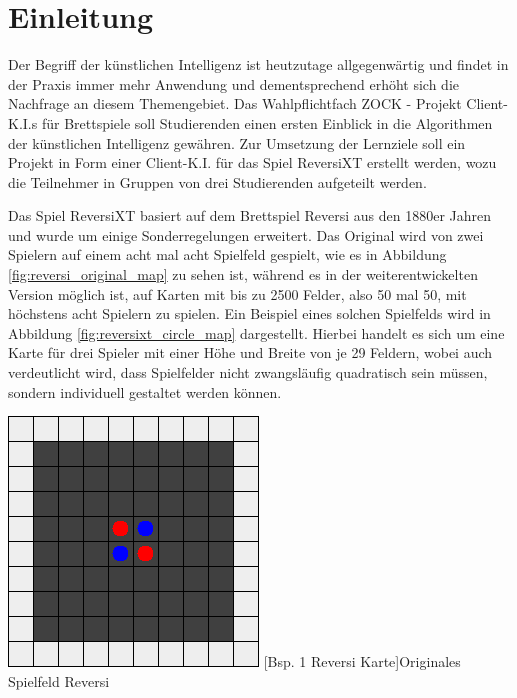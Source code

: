 \documentclass[12pt,a4paper,bibliography=totocnumbered,listof=totocnumbered]{article}
\begin{document}
\section{Einleitung} \label{kap:Einleitung}
Der Begriff der \glqq künstlichen Intelligenz\grqq{} ist heutzutage allgegenwärtig und findet in der Praxis immer mehr Anwendung und dementsprechend erhöht sich die Nachfrage an diesem Themengebiet.
Das Wahlpflichtfach \glqq ZOCK - Projekt Client-K.I.s für Brettspiele\grqq{} soll Studierenden einen ersten Einblick in die Algorithmen der künstlichen Intelligenz gewähren. Zur Umsetzung der Lernziele soll ein Projekt in Form einer Client-K.I. für das Spiel ReversiXT erstellt werden, wozu die Teilnehmer in Gruppen von drei Studierenden aufgeteilt werden. 

Das Spiel ReversiXT basiert auf dem Brettspiel Reversi aus den 1880er Jahren und wurde um einige Sonderregelungen erweitert. Das Original wird von zwei Spielern auf einem acht mal acht Spielfeld gespielt, wie es in Abbildung \ref{fig:reversi_original_map} zu sehen ist, während es in der weiterentwickelten Version möglich ist, auf Karten mit bis zu 2500 Felder, also 50 mal 50, mit höchstens acht Spielern zu spielen. Ein Beispiel eines solchen Spielfelds wird in Abbildung \ref{fig:reversixt_circle_map} dargestellt. Hierbei handelt es sich um eine Karte für drei Spieler mit einer Höhe und Breite von je 29 Feldern, wobei auch verdeutlicht wird, dass Spielfelder nicht zwangsläufig quadratisch sein müssen, sondern individuell gestaltet werden können.

\vspace{1em}
\begin{minipage}{\linewidth}
	\centering
	\includegraphics[width=0.4\linewidth]{pics/reversi_original_map.png}
	[Bsp. 1 Reversi Karte]{Originales Spielfeld Reversi}
	\label{fig:reversi_original_map}
\end{minipage}
\\
\end{document}
